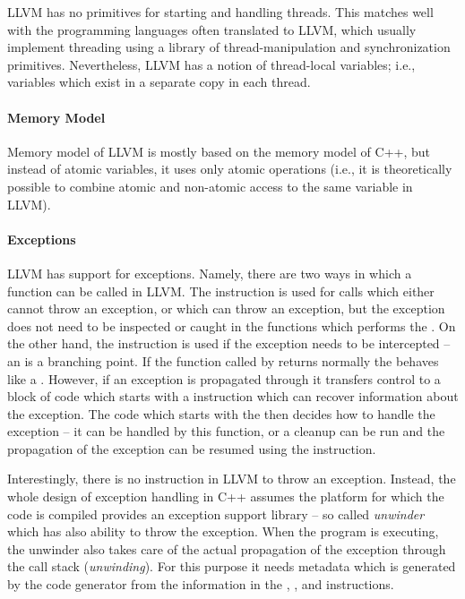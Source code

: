 LLVM has no primitives for starting and handling threads.
This matches well with the programming languages often translated to LLVM,
which usually implement threading using a library of thread-manipulation and
synchronization primitives.
Nevertheless, LLVM has a notion of thread-local variables; i.e., variables
which exist in a separate copy in each thread.

\paragraph{Memory Model}

Memory model of LLVM is mostly based on the memory model of C++, but instead of
atomic variables, it uses only atomic operations (i.e., it is theoretically
possible to combine atomic and non-atomic access to the same variable in LLVM).

\paragraph{Exceptions}

LLVM has support for exceptions.
Namely, there are two ways in which a function can be called in LLVM.
The  instruction is used for calls which either cannot throw an
exception, or which can throw an exception, but the exception does not need to
be inspected or caught in the functions which performs the .
On the other hand, the  instruction is used if the exception needs
to be intercepted -- an  is a branching point.
If the function called by  returns normally the  behaves
like a .
However, if an exception is propagated through  it transfers control
to a block of code which starts with a  instruction which can
recover information about the exception.
The code which starts with the  then decides how to handle the
exception -- it can be handled by this function, or a cleanup can be run and
the propagation of the exception can be resumed using the 
instruction.

Interestingly, there is no instruction in LLVM to throw an exception.
Instead, the whole design of exception handling in C++ assumes the platform for
which the code is compiled provides an exception support library -- so called
\emph{unwinder} which has also ability to throw the exception.
When the program is executing, the unwinder also takes care of the actual
propagation of the exception through the call stack (\emph{unwinding}).
For this purpose it needs metadata which is generated by the code generator
from the information in the , , and 
instructions.


